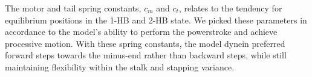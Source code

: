 \documentclass[9pt,twocolumn,twoside]{article}
\begin{document}
\newpage


%
The motor and tail spring constants, $c_m$ and $c_t$, relates to the tendency for equilibrium positions in the 1-HB and 2-HB state. We picked these parameters in accordance to the model's ability to perform the powerstroke and achieve processive motion. With these spring constants, the model dynein preferred forward steps towards the minus-end rather than backward steps, while still maintaining flexibility within the stalk and stapping variance.




%





%
\end{document}
